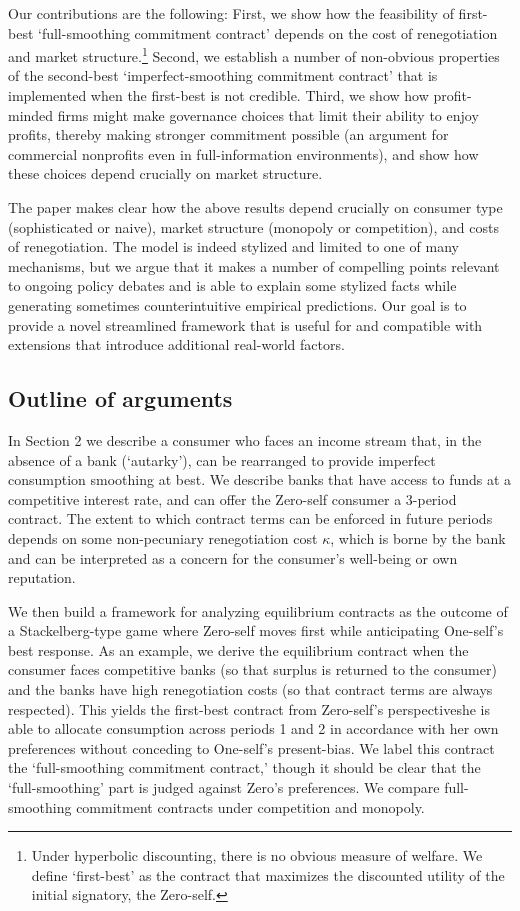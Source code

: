 \documentclass[11pt,english]{article}
\theoremstyle{plain}
\theoremstyle{definition}
\begin{document}
Our contributions are the following: First, we show how the feasibility
of first-best `full-smoothing commitment contract' depends on the
cost of renegotiation and market structure.\footnote{Under hyperbolic discounting, there is no obvious measure of welfare.
We define `first-best' as the contract that maximizes the discounted
utility of the initial signatory, the Zero-self.} Second, we establish a number of non-obvious properties of the second-best
`imperfect-smoothing commitment contract' that is implemented when
the first-best is not credible. Third, we show how profit-minded firms
might make governance choices that limit their ability to enjoy profits,
thereby making stronger commitment possible (an argument for commercial
nonprofits even in full-information environments), and show how these
choices depend crucially on market structure.

The paper makes clear how the above results depend crucially on consumer
type (sophisticated or naive), market structure (monopoly or competition),
and costs of renegotiation. The model is indeed stylized and limited
to one of many mechanisms, but we argue that it makes a number of
compelling points relevant to ongoing policy debates and is able to
explain some stylized facts while generating sometimes counterintuitive
empirical predictions. Our goal is to provide a novel streamlined
framework that is useful for and compatible with extensions that introduce
additional real-world factors.

\subsection{Outline of arguments}

In Section 2 we describe a consumer who faces an income stream that,
in the absence of a bank (`autarky'), can be rearranged to provide
imperfect consumption smoothing at best. We describe banks that have
access to funds at a competitive interest rate, and can offer the
Zero-self consumer a 3-period contract. The extent to which contract
terms can be enforced in future periods depends on some non-pecuniary
renegotiation cost $\kappa$, which is borne by the bank and can be
interpreted as a concern for the consumer's well-being or own reputation.

We then build a framework for analyzing equilibrium contracts as the
outcome of a Stackelberg-type game where Zero-self moves first while
anticipating One-self's best response. As an example, we derive the
equilibrium contract when the consumer faces competitive banks (so
that surplus is returned to the consumer) and the banks have high
renegotiation costs (so that contract terms are always respected).
This yields the first-best contract from Zero-self's perspective\textendash she
is able to allocate consumption across periods 1 and 2 in accordance
with her own preferences without conceding to One-self's present-bias.
We label this contract the `full-smoothing commitment contract,' though
it should be clear that the `full-smoothing' part is judged against
Zero's preferences. We compare full-smoothing commitment contracts
under competition and monopoly.
\end{document}
